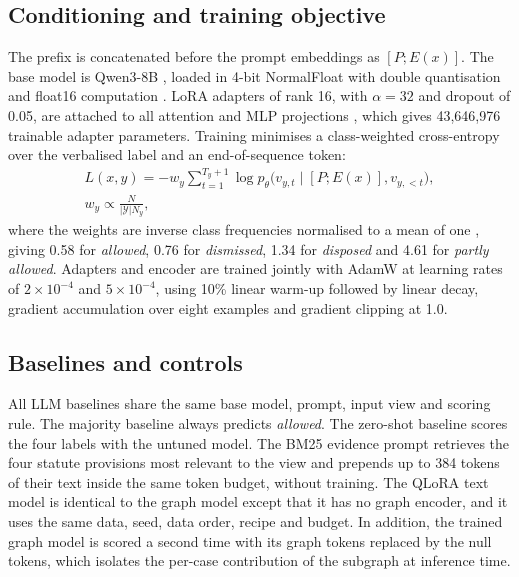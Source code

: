 \documentclass[journal]{IEEEtran}
\newcommand{\cls}[1]{\emph{#1}}
\begin{document}
\subsection{Conditioning and training objective}
The prefix is concatenated before the prompt embeddings as $[P;E(x)]$. The base model is Qwen3-8B \cite{r59}, loaded in 4-bit NormalFloat with double quantisation and float16 computation \cite{r14}. LoRA adapters of rank 16, with $\alpha=32$ and dropout of 0.05, are attached to all attention and MLP projections \cite{r13}, which gives 43,646,976 trainable adapter parameters. Training minimises a class-weighted cross-entropy over the verbalised label and an end-of-sequence token:
\begin{equation}
\begin{gathered}L(x,y)=-w_y\sum_{t=1}^{T_y+1}\log p_\theta\bigl(v_{y,t}\mid[P;E(x)],v_{y,<t}\bigr),\\ w_y\propto\frac{N}{|\mathcal{Y}|N_y},\end{gathered}
\end{equation}
where the weights are inverse class frequencies normalised to a mean of one \cite{r60}, giving 0.58 for \cls{allowed}, 0.76 for \cls{dismissed}, 1.34 for \cls{disposed} and 4.61 for \cls{partly allowed}. Adapters and encoder are trained jointly with AdamW at learning rates of $2\times10^{-4}$ and $5\times10^{-4}$, using 10\% linear warm-up followed by linear decay, gradient accumulation over eight examples and gradient clipping at 1.0.

\subsection{Baselines and controls}
All LLM baselines share the same base model, prompt, input view and scoring rule. The majority baseline always predicts \cls{allowed}. The zero-shot baseline scores the four labels with the untuned model. The BM25 evidence prompt retrieves the four statute provisions most relevant to the view \cite{r63} and prepends up to 384 tokens of their text inside the same token budget, without training. The QLoRA text model is identical to the graph model except that it has no graph encoder, and it uses the same data, seed, data order, recipe and budget. In addition, the trained graph model is scored a second time with its graph tokens replaced by the null tokens, which isolates the per-case contribution of the subgraph at inference time.
\end{document}
